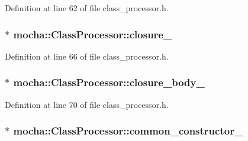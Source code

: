 Definition at line 62 of file class\_\-processor.h.

\hypertarget{classmocha_1_1_class_processor_aeb64e1570c436c65ed98c3c1274799d6}{
\subsubsection[{closure\_\-}]{$\ast$ {\bf mocha::ClassProcessor::closure\_\-}}}
\label{classmocha_1_1_class_processor_aeb64e1570c436c65ed98c3c1274799d6}


Definition at line 66 of file class\_\-processor.h.

\hypertarget{classmocha_1_1_class_processor_a224ba4a0c7686ccf21161a02550bf713}{
\subsubsection[{closure\_\-body\_\-}]{$\ast$ {\bf mocha::ClassProcessor::closure\_\-body\_\-}}}
\label{classmocha_1_1_class_processor_a224ba4a0c7686ccf21161a02550bf713}


Definition at line 70 of file class\_\-processor.h.

\hypertarget{classmocha_1_1_class_processor_ab5674a30639efa457b81aabe2cc7778d}{
\subsubsection[{common\_\-constructor\_\-}]{$\ast$ {\bf mocha::ClassProcessor::common\_\-constructor\_\-}}}
\label{classmocha_1_1_class_processor_ab5674a30639efa457b81aabe2cc7778d}


